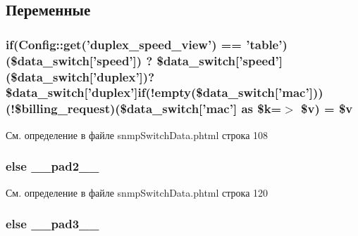 \subsection{Переменные}
\hypertarget{snmp_switch_data_8phtml_acdc3d14aaf4fe531149c8ceaea738f59}{
\subsubsection[{(!\$billing\-\_\-request)}]{\setlength{\rightskip}{0pt plus 5cm}if({\bf Config\-::get}('duplex\-\_\-speed\-\_\-view') == 'table') (\$data\-\_\-switch\mbox{[}'speed'\mbox{]}) ? \$data\-\_\-switch\mbox{[}'speed'\mbox{]} (\$data\-\_\-switch\mbox{[}'duplex'\mbox{]})?\$data\-\_\-switch\mbox{[}'duplex'\mbox{]}if(!empty(\$data\-\_\-switch\mbox{[}'mac'\mbox{]})) (!\$billing\-\_\-request)(\$data\-\_\-switch\mbox{[}'mac'\mbox{]} as \$k=$>$ \$v) = \$v}}\label{snmp_switch_data_8phtml_acdc3d14aaf4fe531149c8ceaea738f59}


См. определение в файле snmp\-Switch\-Data.\-phtml строка 108

\hypertarget{snmp_switch_data_8phtml_aed2d37b4e8da3f52103ae96ce9d26d82}{
\subsubsection[{\-\_\-\-\_\-pad2\-\_\-\-\_\-}]{\setlength{\rightskip}{0pt plus 5cm}else \-\_\-\-\_\-pad2\-\_\-\-\_\-}}\label{snmp_switch_data_8phtml_aed2d37b4e8da3f52103ae96ce9d26d82}


См. определение в файле snmp\-Switch\-Data.\-phtml строка 120

\hypertarget{snmp_switch_data_8phtml_ad3aa1069376b85bd4e503b216d54b18d}{
\subsubsection[{\-\_\-\-\_\-pad3\-\_\-\-\_\-}]{\setlength{\rightskip}{0pt plus 5cm}else \-\_\-\-\_\-pad3\-\_\-\-\_\-}}\label{snmp_switch_data_8phtml_ad3aa1069376b85bd4e503b216d54b18d}


